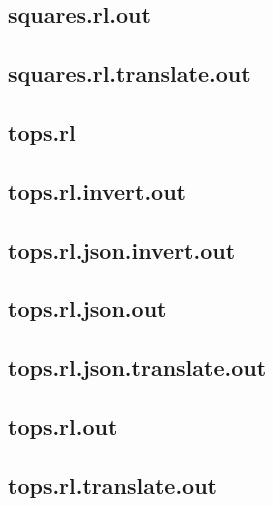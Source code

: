 \subsection{squares.rl.out}
\label{app:squares_rl.out}

\subsection{squares.rl.translate.out}
\label{app:squares_rl.translate.out}

\subsection{tops.rl}
\label{app:tops_rl}

\subsection{tops.rl.invert.out}
\label{app:tops_rl.invert.out}

\subsection{tops.rl.json.invert.out}
\label{app:tops_rl.json.invert.out}

\subsection{tops.rl.json.out}
\label{app:tops_rl.json.out}

\subsection{tops.rl.json.translate.out}
\label{app:tops_rl.json.translate.out}

\subsection{tops.rl.out}
\label{app:tops_rl.out}

\subsection{tops.rl.translate.out}
\label{app:tops_rl.translate.out}

